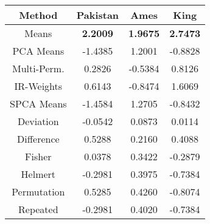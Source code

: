\begin{tabular}{ |c|c|c|c| } 
\hline
Method & Pakistan& Ames& King\\
\hline
Means&	\textbf{2.2009}&\textbf{1.9675	}&\textbf{	2.7473}\\
PCA Means&	-1.4385&	1.2001&	-0.8828	\\
Multi-Perm.&	0.2826&		-0.5384&		0.8126\\
IR-Weights&	0.6143&		-0.8474&		1.6069\\
SPCA Means&	-1.4584&	1.2705&		-0.8432\\
Deviation&	-0.0542&		0.0873&	0.0114\\
Difference&	0.5288&		0.2160&		0.4088\\
Fisher&	0.0378&		0.3422&		-0.2879\\
Helmert	&-0.2981&		0.3975&	-0.7384\\
Permutation&	0.5285&	0.4260&		-0.8074\\
Repeated&	-0.2981&	0.4020&		-0.7384\\



\hline
\end{tabular}